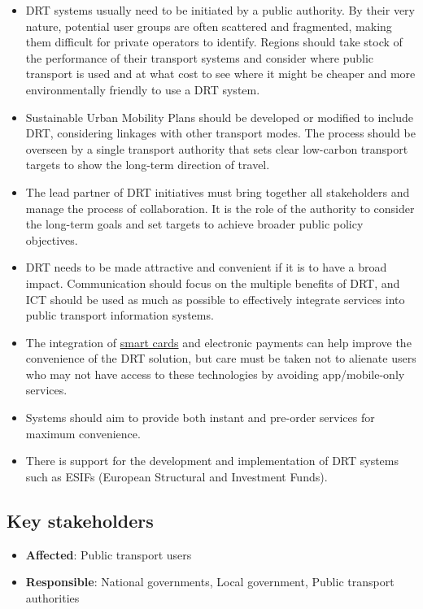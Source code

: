 \documentclass[
]{book}
\providecommand{\tightlist}{%
  \setlength{\itemsep}{0pt}\setlength{\parskip}{0pt}}
\begin{document}
\begin{itemize}
\tightlist
\item
  DRT systems usually need to be initiated by a public authority. By their very nature, potential user groups are often scattered and fragmented, making them difficult for private operators to identify. Regions should take stock of the performance of their transport systems and consider where public transport is used and at what cost to see where it might be cheaper and more environmentally friendly to use a DRT system.
\item
  Sustainable Urban Mobility Plans should be developed or modified to include DRT, considering linkages with other transport modes. The process should be overseen by a single transport authority that sets clear low-carbon transport targets to show the long-term direction of travel.
\item
  The lead partner of DRT initiatives must bring together all stakeholders and manage the process of collaboration. It is the role of the authority to consider the long-term goals and set targets to achieve broader public policy objectives.
\item
  DRT needs to be made attractive and convenient if it is to have a broad impact. Communication should focus on the multiple benefits of DRT, and ICT should be used as much as possible to effectively integrate services into public transport information systems.
\item
  The integration of \protect\hyperlink{contactless_cards}{smart cards} and electronic payments can help improve the convenience of the DRT solution, but care must be taken not to alienate users who may not have access to these technologies by avoiding app/mobile-only services.
\item
  Systems should aim to provide both instant and pre-order services for maximum convenience.
\item
  There is support for the development and implementation of DRT systems such as ESIFs (European Structural and Investment Funds).
\end{itemize}

\hypertarget{key-stakeholders-23}{%
\subsection*{Key stakeholders}\label{key-stakeholders-23}}

\begin{itemize}
\tightlist
\item
  \textbf{Affected}: Public transport users
\item
  \textbf{Responsible}: National governments, Local government, Public transport authorities
\end{itemize}
\end{document}
